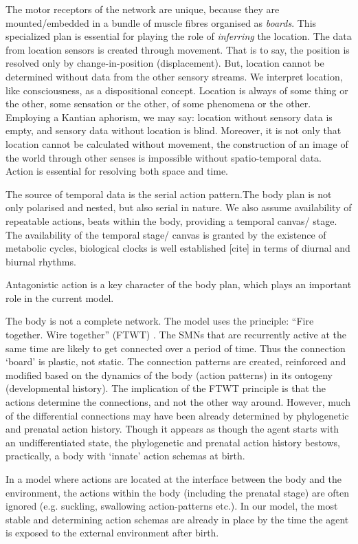 The motor receptors of the network are unique, because they are mounted/embedded in a bundle of muscle fibres organised as \textit{boards}. This specialized plan is essential for playing the role of \textit{inferring} the location. The data from location sensors is created through movement. That is to say, the position is resolved only by change-in-position (displacement). But, location cannot be determined without data from the other sensory streams. We interpret location, like consciousness, as a dispositional concept. Location is always of some thing or the other, some sensation or the other, of some phenomena or the other. Employing a Kantian aphorism, we may say: location without sensory data is empty, and sensory data without location is blind. Moreover, it is not only that location cannot be calculated without movement, the construction of an image of the world through other senses is impossible without spatio-temporal data. Action is essential for resolving both space and time.  

The source of temporal data is the serial action pattern.The body plan is not only polarised and nested, but also serial in nature. We also assume availability of repeatable actions, beats within the body, providing a temporal canvas/ stage. The availability of the temporal stage/ canvas is granted by the existence of metabolic cycles, biological clocks is well established [cite] in terms of diurnal and biurnal rhythms.

Antagonistic action is a key character of the body plan, which plays an important role in the current model. 

The body is not a complete network. The model uses the principle: ``Fire together. Wire together'' (FTWT) \cite{hebb1949organisation}. The SMNs that are recurrently active at the same time are likely to get connected over a period of time. Thus the connection `board' is plastic, not static. The connection patterns are created, reinforced and modified based on the dynamics of the body (action patterns) in its ontogeny (developmental history). The implication of the FTWT principle is that the actions determine the connections, and not the other way around. However, much of the differential connections may have been already determined by phylogenetic and prenatal action history. Though it appears as though the agent starts with an undifferentiated state, the phylogenetic and prenatal action history bestows, practically, a body with `innate' action schemas at birth.

In a model where actions are located at the interface between the body and the environment, the actions within the body (including the prenatal stage) are often ignored (e.g. suckling, swallowing action-patterns etc.). In our model, the most stable and determining action schemas are already in place by the time the agent is exposed to the external environment after birth. 

